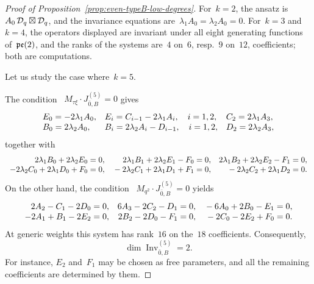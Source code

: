 \documentclass[12pt,a4paper]{amsart}
\theoremstyle{thm}
\theoremstyle{definition}
\newcommand {\Dq}{\cD_q}
\begin{document}
\begin{proof}[Proof of Proposition~\textup{\ref{prop:even-typeB-low-degrees}}]
For~$k=2$, the ansatz is~$A_0\,\Dq\boxtimes\Dq$, and the invariance equations are~$\lambda_1A_0=\lambda_2A_0=0$.
For~$k=3$ and~$k=4$, the operators displayed are invariant under all eight generating
functions of~${\mathfrak{pe}}(2)$, and the ranks of the systems are~$4$ on~$6$, resp.~$9$ on~$12$,
coefficients; both are computations.

Let us study the case where~\(k=5\).

The condition~%
$
M_{\tau\xi}\cdot J_{\bar0,B}^{(5)}=0
$ gives
\[
\begin{array}{r@{}l@{\quad}r@{}l@{\quad}r@{}l}
&E_0=-2\lambda_1A_0,
&&E_i=C_{i-1}-2\lambda_1A_i,
\quad i=1,2,
&&C_2=2\lambda_1A_3,
\\
&B_0=2\lambda_2A_0,
&&B_i=2\lambda_2A_i-D_{i-1},
\quad i=1,2,
&&D_2=2\lambda_2A_3,
\end{array}
\]
together with
\[
\begin{array}{r@{}l@{\quad}r@{}l@{\quad}r@{}l}
2\lambda_1B_0+2\lambda_2E_0&{}=0,&
2\lambda_1B_1+2\lambda_2E_1-F_0&{}=0,&
2\lambda_1B_2+2\lambda_2E_2-F_1&{}=0,\\
-2\lambda_2C_0+2\lambda_1D_0+F_0&{}=0,&
{}-2\lambda_2C_1+2\lambda_1D_1+F_1&{}=0,&
{}-2\lambda_2C_2+2\lambda_1D_2&{}=0.
\end{array}
\]
On the other hand, the condition~%
$
M_{q^2}\cdot J_{\bar0,B}^{(5)}=0
$ yields
\[
\begin{array}{r@{}l@{\quad}r@{}l@{\quad}r@{}l}
2A_2-C_1-2D_0&{}=0,
&
6A_3-2C_2-D_1&{}=0,
&
{}-6A_0+2B_0-E_1&{}=0,
\\
-2A_1+B_1-2E_2&{}=0,
&
2B_2-2D_0-F_1&{}=0,
&
{}-2C_0-2E_2+F_0&{}=0.
\end{array}
\]
At generic weights this system has rank~\(16\)
on the~\(18\) coefficients. Consequently,
\[
\dim\operatorname{Inv}_{\bar0,B}^{(5)}=2.
\]
For instance, \(E_2\) and~\(F_1\) may be chosen as free parameters,
and all the remaining coefficients are determined by them.
\end{proof}
\end{document}
